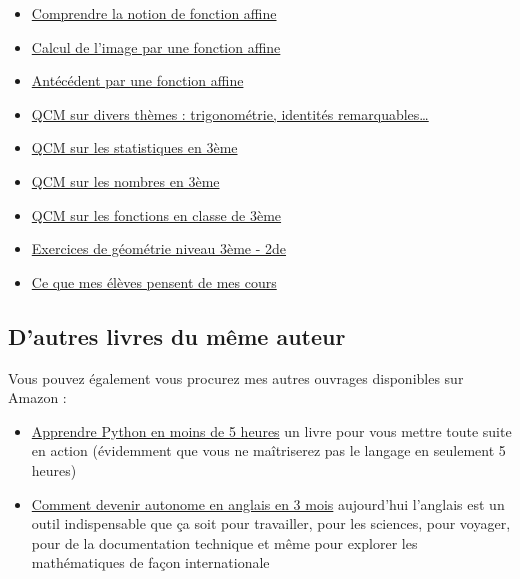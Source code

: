 \documentclass[11pt]{article}
\begin{document}
\begin{itemize}
\item \href{https://didaskalosmanthanon.github.io/fct-affine/}{Comprendre la notion de fonction affine}
\item \href{https://didaskalosmanthanon.github.io/image-fonction-affine/index.html}{Calcul de l'image par une fonction affine}
\item \href{https://didaskalosmanthanon.github.io/antecedent-fonction-affine/index.html}{Antécédent par une fonction affine}
\item \href{https://didaskalosmanthanon.github.io/quizz/index.html}{QCM sur divers thèmes : trigonométrie, identités remarquables\ldots{}}
\item \href{https://didaskalosmanthanon.github.io/quizz-stats-3eme/index.html}{QCM sur les statistiques en 3ème}
\item \href{https://didaskalosmanthanon.github.io/qcm-numbers/}{QCM sur les nombres en 3ème}
\item \href{https://didaskalosmanthanon.github.io/quizz-fonctions-3eme/index.html}{QCM sur les fonctions en classe de 3ème}
\item \href{https://didaskalosmanthanon.github.io/geometry/exercice1.html}{Exercices de géométrie niveau 3ème - 2de}
\item \href{https://didaskalosmanthanon.github.io/testimonial-slider/index.html}{Ce que mes élèves pensent de mes cours}
\end{itemize}


\subsection{D'autres livres du même auteur}
\label{sec:orgdec4da0}

Vous pouvez également vous procurez mes autres ouvrages disponibles
sur Amazon :



\begin{itemize}
\item \href{https://amzn.to/40n8rdI}{Apprendre Python en moins de 5 heures} un livre pour vous mettre
toute suite en action (évidemment que vous ne maîtriserez pas le
langage en seulement 5 heures)
\item \href{https://amzn.to/3THL1Mq}{Comment devenir autonome en anglais en 3 mois} aujourd'hui l'anglais
est un outil indispensable que ça soit pour travailler, pour les
sciences, pour voyager, pour de la documentation technique et même
pour explorer les mathématiques de façon internationale
\end{itemize}
\end{document}

